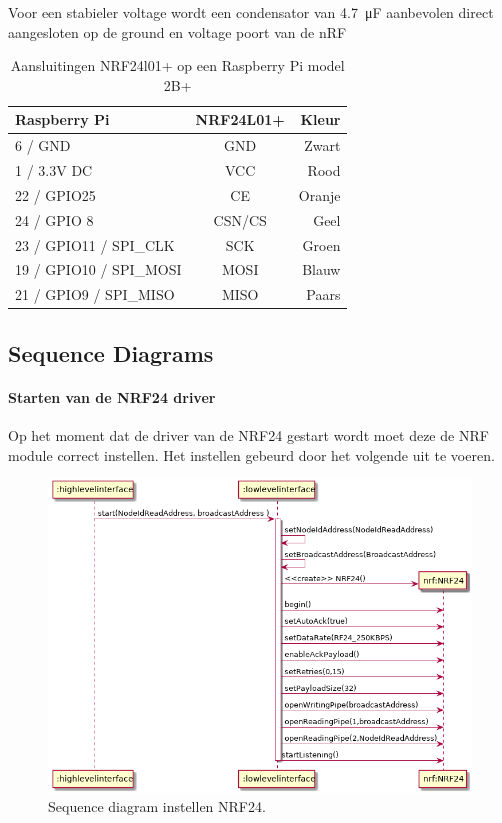 \documentclass[a4paper, 11pt, oneside]{report}
\begin{document}
Voor een stabieler voltage wordt een condensator van \SI{4.7}{\micro\farad} aanbevolen direct aangesloten op de ground en voltage poort van de nRF

\begin{table}[H]
	\centering
		\begin{tabular}{|l|c|r|}
			\hline
			\rowcolor[HTML]{C0C0C0} 
			Raspberry Pi & NRF24L01+ & Kleur \\ \hline
			6 / GND & GND & Zwart \\ \hline
			1 / 3.3V DC & VCC & Rood \\ \hline
			22 / GPIO25 & CE & Oranje \\ \hline
			24 / GPIO 8 & CSN/CS & Geel \\ \hline
			23 / GPIO11 / SPI\_CLK & SCK & Groen \\ \hline
			19 / GPIO10 / SPI\_MOSI & MOSI & Blauw \\ \hline
			21 / GPIO9 / SPI\_MISO & MISO & Paars \\ \hline
		\end{tabular}%
	\caption{Aansluitingen NRF24l01+ op een Raspberry Pi model 2B+}
	\label{tab:raspberry-nrf-aanslutingen}
\end{table}

\subsection{Sequence Diagrams}
\label{DetailedDesign:NRF24:sequence}

\paragraph{Starten van de NRF24 driver}
\label{DetailedDesign:NRF24:sequence:SetupNRF24}

Op het moment dat de driver van de NRF24 gestart wordt moet deze de NRF module correct instellen.
Het instellen gebeurd door het volgende uit te voeren.
\begin{figure}[H]
	\begin{center}\includegraphics[width=.9\linewidth]{UML/out/NRF24/sequence/SetupNRF24/SetupNRF24.png}\end{center}
	\caption{Sequence diagram instellen NRF24.}
	\label{fig:NRF24:sequence:SetupNRF24}
\end{figure}
\end{document}
